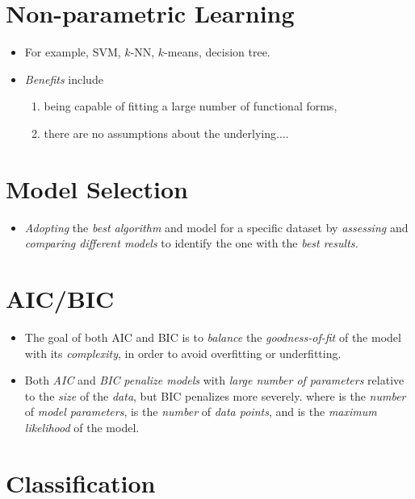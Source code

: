 \documentclass[
	title={ML Fundamentals}
]{cs584notes}
\begin{document}
\section{Non-parametric Learning}\label{sec:non-parametric-learning}

\begin{itemize}
	\item For example, SVM, $k$-NN, $k$-means, decision tree.
	\item \emph{Benefits} include
	\begin{enumerate}[label=(\alph*)]
		\item being capable of fitting a large number of functional forms,
		\item there are no assumptions about the underlying$\dots$.
	\end{enumerate}
\end{itemize}

\section{Model Selection}\label{sec:model-selection}
\begin{itemize}
	\item \emph{Adopting} the \emph{best algorithm} and model for a specific dataset by \emph{assessing} and \emph{comparing different models} to identify the one with the \emph{best results.}
\end{itemize}

\section{AIC/BIC}\label{sec:aic/bic}
\begin{itemize}
	\item The goal of both AIC and BIC is to \emph{balance} the \emph{goodness-of-fit} of the model with its \emph{complexity}, in order to avoid overfitting or underfitting.
	\item Both \emph{AIC} and \emph{BIC} \emph{penalize models} with \emph{large number of parameters} relative to the \emph{size} of the \emph{data}, but BIC penalizes more severely.
	where  is the \emph{number} of \emph{model parameters},  is the \emph{number} of \emph{data points}, and  is the \emph{maximum likelihood} of the model.
\end{itemize}

\section{Classification}\label{sec:classification}
\end{document}
